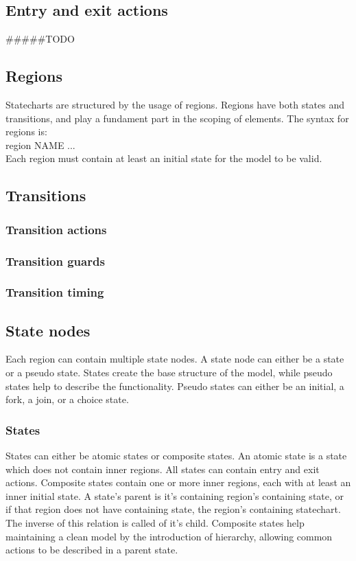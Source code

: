 {  \subsection{Entry and exit actions}
#####TODO
  \subsection{Regions}
Statecharts are structured by the usage of regions. Regions have both states and transitions, and play a fundament part in the scoping of elements. The syntax for regions is: \\region NAME { ... }\\ Each region must contain at least an initial state for the model to be valid.
  \subsection{Transitions}

    \subsubsection{Transition actions}
    \subsubsection{Transition guards}
    \subsubsection{Transition timing}
  \subsection{State nodes}
Each region can contain multiple state nodes. A state node can either be a state or a pseudo state. States create the base structure of the model, while pseudo states help to describe the functionality. Pseudo states can either be an initial, a fork, a join, or a choice state.
    \subsubsection{States}
States can either be atomic states or composite states. An atomic state is a state which does not contain inner regions. All states can contain entry and exit actions. Composite states contain one or more inner regions, each with at least an inner initial state. A state's parent is it's containing region's containing state, or if that region does not have containing state, the region's containing statechart. The inverse of this relation is called of it's child. Composite states help maintaining a clean model by the introduction of hierarchy, allowing common actions to be described in a parent state.
}
